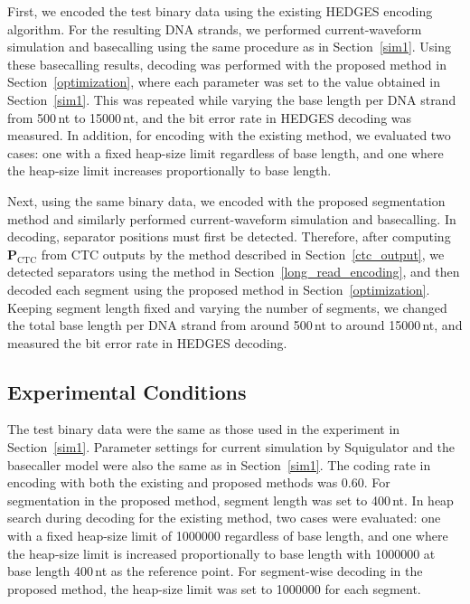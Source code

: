 \documentclass[sotsuron]{kuee}
\begin{document}
First, we encoded the test binary data using the existing HEDGES encoding
algorithm.
For the resulting DNA strands, we performed current-waveform simulation and
basecalling using the same procedure as in Section~\ref{sim1}.
Using these basecalling results, decoding was performed with the proposed
method in Section~\ref{optimization}, where each parameter was set to the value
obtained in Section~\ref{sim1}.
This was repeated while varying the base length per DNA strand from 500\,nt to
15000\,nt, and the bit error rate in HEDGES decoding was measured.
In addition, for encoding with the existing method, we evaluated two cases:
one with a fixed heap-size limit regardless of base length, and one where the
heap-size limit increases proportionally to base length.

Next, using the same binary data, we encoded with the proposed segmentation
method and similarly performed current-waveform simulation and basecalling.
In decoding, separator positions must first be detected. Therefore, after
computing $\bm{P}_{\mathrm{CTC}}$ from CTC outputs by the method described in
Section~\ref{ctc_output}, we detected separators using the method in
Section~\ref{long_read_encoding}, and then decoded each segment using the
proposed method in Section~\ref{optimization}.
Keeping segment length fixed and varying the number of segments, we changed the
total base length per DNA strand from around 500\,nt to around 15000\,nt, and
measured the bit error rate in HEDGES decoding.


\subsection{Experimental Conditions}
The test binary data were the same as those used in the experiment in
Section~\ref{sim1}.
Parameter settings for current simulation by Squigulator and the basecaller
model were also the same as in Section~\ref{sim1}.
The coding rate in encoding with both the existing and proposed methods was
0.60.
For segmentation in the proposed method, segment length was set to 400\,nt.
In heap search during decoding for the existing method, two cases were
evaluated: one with a fixed heap-size limit of 1000000 regardless of base
length, and one where the heap-size limit is increased proportionally to base
length with 1000000 at base length 400\,nt as the reference point.
For segment-wise decoding in the proposed method, the heap-size limit was set
to 1000000 for each segment.
\end{document}
